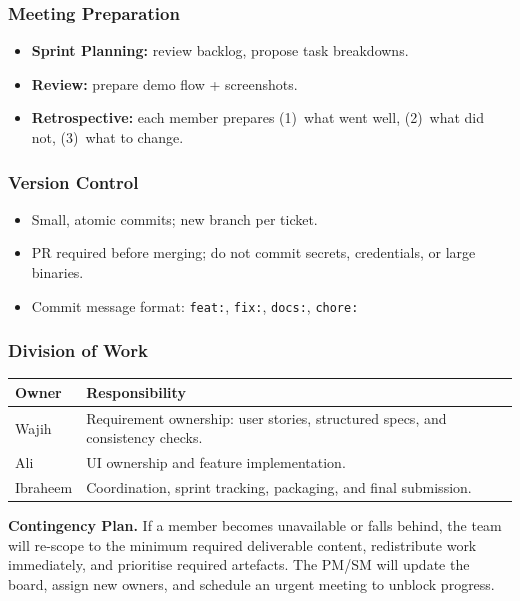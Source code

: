 \documentclass[12pt, a4paper]{article}
\begin{document}
\subsubsection*{Meeting Preparation}
\begin{itemize}
  \item \textbf{Sprint Planning:} review backlog, propose task breakdowns.
  \item \textbf{Review:} prepare demo flow + screenshots.
  \item \textbf{Retrospective:} each member prepares (1)~what went well,
        (2)~what did not, (3)~what to change.
\end{itemize}

\subsubsection*{Version Control}
\begin{itemize}
  \item Small, atomic commits; new branch per ticket.
  \item PR required before merging; do not commit secrets, credentials, or large binaries.
  \item Commit message format: \texttt{feat:}, \texttt{fix:}, \texttt{docs:}, \texttt{chore:}
\end{itemize}

\subsubsection*{Division of Work}
\begin{tabularx}{\linewidth}{>{}l X}
  \toprule
  \textbf{Owner} & \textbf{Responsibility} \\
  \midrule
  Wajih     & Requirement ownership: user stories, structured specs, and consistency checks. \\[3pt]
  Ali       & UI ownership and feature implementation. \\[3pt]
  Ibraheem  & Coordination, sprint tracking, packaging, and final submission. \\
  \bottomrule
\end{tabularx}

\medskip
\noindent\textbf{Contingency Plan.}
If a member becomes unavailable or falls behind, the team will re-scope to the
minimum required deliverable content, redistribute work immediately, and
prioritise required artefacts. The PM/SM will update the board, assign new owners,
and schedule an urgent meeting to unblock progress.
\end{document}
